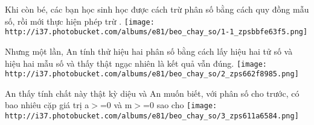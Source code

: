 Khi còn bé, các bạn học sinh học được cách trừ phân số bằng cách quy đồng mẫu số, rồi mới thực hiện phép trừ      .   
\texttt{[image: http://i37.photobucket.com/albums/e81/beo\_chay\_so/1-1\_zpsbbfe63f5.png]}

    Nhưng một lần, An tính thử hiệu hai phân số bằng cách lấy hiệu hai tử số và hiệu hai mẫu số và thấy thật ngạc nhiên là kết quả vẫn đúng.    
\texttt{[image: http://i37.photobucket.com/albums/e81/beo\_chay\_so/2\_zps662f8985.png]}

     An thấy tính chất này thật kỳ diệu và An muốn biết, với phân số         cho trước, có bao nhiêu cặp giá trị         a$>$=0 và m$>$=0         sao cho     
\texttt{[image: http://i37.photobucket.com/albums/e81/beo\_chay\_so/3\_zps611a6584.png]}

\